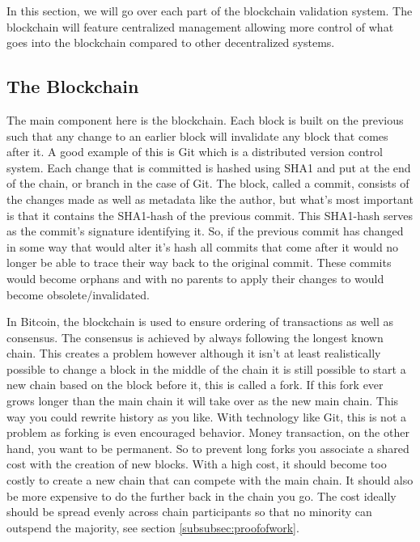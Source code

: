 \documentclass[11pt]{article}
\begin{document}
In this section, we will go over each part of the blockchain validation system. The blockchain will feature centralized management allowing more control of what goes into the blockchain compared to other decentralized systems.

\subsection{The Blockchain}
The main component here is the blockchain. Each block is built on the previous such that any change to an earlier block will invalidate any block that comes after it. A good example of this is Git which is a distributed version control system. Each change that is committed is hashed using SHA1 and put at the end of the chain, or branch in the case of Git. The block, called a commit, consists of the changes made as well as metadata like the author, but what's most important is that it contains the SHA1-hash of the previous commit. This SHA1-hash serves as the commit's signature identifying it. So, if the previous commit has changed in some way that would alter it's hash all commits that come after it would no longer be able to trace their way back to the original commit. These commits would become orphans and with no parents to apply their changes to would become obsolete/invalidated.


In Bitcoin, the blockchain is used to ensure ordering of transactions as well as consensus. The consensus is achieved by always following the longest known chain. This creates a problem however although it isn't at least realistically possible to change a block in the middle of the chain it is still possible to start a new chain based on the block before it, this is called a fork. If this fork ever grows longer than the main chain it will take over as the new main chain. This way you could rewrite history as you like. With technology like Git, this is not a problem as forking is even encouraged behavior. Money transaction, on the other hand, you want to be permanent. So to prevent long forks you associate a shared cost with the creation of new blocks. With a high cost, it should become too costly to create a new chain that can compete with the main chain. It should also be more expensive to do the further back in the chain you go. The cost ideally should be spread evenly across chain participants so that no minority can outspend the majority, see section \ref{subsubsec:proofofwork}.
\end{document}
